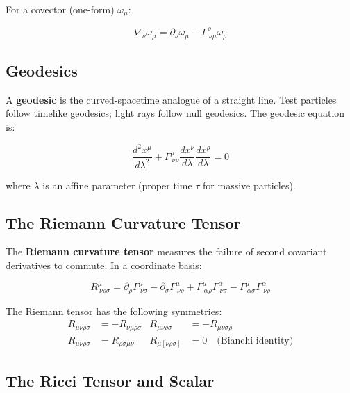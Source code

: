 \documentclass[12pt]{article}
\theoremstyle{definition}
\theoremstyle{remark}
\begin{document}
For a covector (one-form) $\omega_{\mu}$:

\begin{equation}
  \nabla_{\nu}\omega_{\mu} = \partial_{\nu}\omega_{\mu} - \Gamma^{\rho}_{\ \nu\mu}\omega_{\rho}
\end{equation}

\subsection{Geodesics}

A \textbf{geodesic} is the curved-spacetime analogue of a straight line. Test particles follow timelike geodesics; light rays follow null geodesics. The geodesic equation is:

\begin{equation}\label{eq:geodesic}
  \frac{d^{2}x^{\mu}}{d\lambda^{2}} + \Gamma^{\mu}_{\ \nu\rho}\frac{dx^{\nu}}{d\lambda}\frac{dx^{\rho}}{d\lambda} = 0
\end{equation}

where $\lambda$ is an affine parameter (proper time $\tau$ for massive particles).

\subsection{The Riemann Curvature Tensor}

The \textbf{Riemann curvature tensor} measures the failure of second covariant derivatives to commute. In a coordinate basis:

\begin{equation}\label{eq:riemann}
  R^{\mu}_{\ \nu\rho\sigma} = \partial_{\rho}\Gamma^{\mu}_{\ \nu\sigma}
    - \partial_{\sigma}\Gamma^{\mu}_{\ \nu\rho}
    + \Gamma^{\mu}_{\ \alpha\rho}\Gamma^{\alpha}_{\ \nu\sigma}
    - \Gamma^{\mu}_{\ \alpha\sigma}\Gamma^{\alpha}_{\ \nu\rho}
\end{equation}

The Riemann tensor has the following symmetries:
\begin{align}
  R_{\mu\nu\rho\sigma} &= -R_{\nu\mu\rho\sigma} &
  R_{\mu\nu\rho\sigma} &= -R_{\mu\nu\sigma\rho} \\
  R_{\mu\nu\rho\sigma} &= R_{\rho\sigma\mu\nu} &
  R_{\mu[\nu\rho\sigma]} &= 0 \quad \text{(Bianchi identity)}
\end{align}

\subsection{The Ricci Tensor and Scalar}
\end{document}
